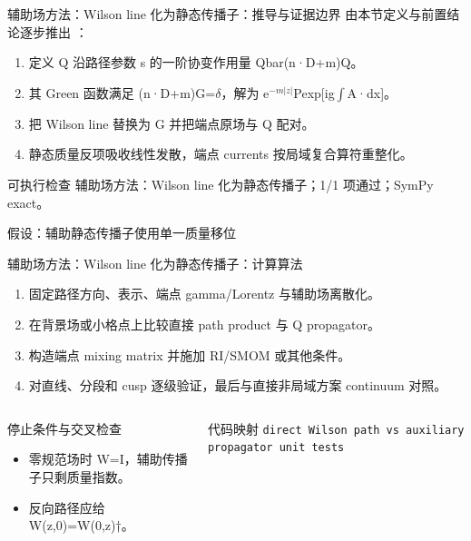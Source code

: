 \begin{frame}[t]{辅助场方法：Wilson line 化为静态传播子：推导与证据边界}
\footnotesize
{}\quad 由本节定义与前置结论逐步推出 ：
\begin{enumerate}
\item 定义 Q 沿路径参数 s 的一阶协变作用量 Qbar(n·D+m)Q。
\item 其 Green 函数满足 (n·D+m)G=\ensuremath{\delta}，解为 e\ensuremath{^{-m|z|}}Pexp[ig\ensuremath{\int}A·dx]。
\item 把 Wilson line 替换为 G 并把端点原场与 Q 配对。
\item 静态质量反项吸收线性发散，端点 currents 按局域复合算符重整化。
\end{enumerate}\begin{block}{可执行检查}
\quad 辅助场方法：Wilson line 化为静态传播子；1/1 项通过；SymPy exact。
\par\scriptsize 假设：辅助静态传播子使用单一质量移位
\end{block}
\end{frame}

\begin{frame}[t]{辅助场方法：Wilson line 化为静态传播子：计算算法}
\footnotesize
{}\begin{enumerate}
\item 固定路径方向、表示、端点 gamma/\allowbreak{}Lorentz 与辅助场离散化。
\item 在背景场或小格点上比较直接 path product 与 Q propagator。
\item 构造端点 mixing matrix 并施加 RI/\allowbreak{}SMOM 或其他条件。
\item 对直线、分段和 cusp 逐级验证，最后与直接非局域方案 continuum 对照。
\end{enumerate}\begin{columns}[T,onlytextwidth]
\begin{block}{停止条件与交叉检查}\scriptsize\begin{itemize}
\item[\CheckMark] 零规范场时 W=I，辅助传播子只剩质量指数。
\item[\CheckMark] 反向路径应给 W(z,0)=W(0,z)†。
\end{itemize}\end{block}
\begin{block}{代码映射}
\scriptsize \texttt{direct Wilson path vs auxiliary propagator unit tests}
\end{block}\end{columns}\end{frame}

